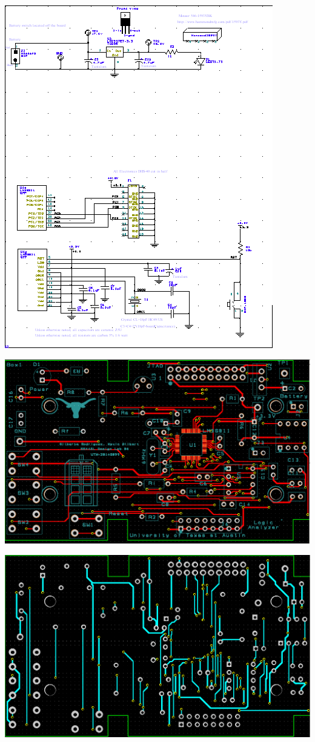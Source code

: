 \documentclass[twoside]{article}
\begin{document}
\centerline{\includegraphics[width=\textwidth]{Circuit2}}
\centerline{\includegraphics[width=\textwidth]{PCB}}
\vskip 0.1in
\centerline{\includegraphics[width=\textwidth]{PCB2}}
\end{document}
